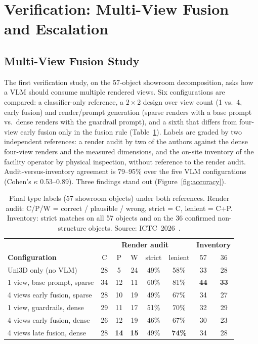 \section{Verification: Multi-View Fusion and Escalation}
\label{sec:exp-verify}

\subsection{Multi-View Fusion Study}
\label{subsec:exp-multiview}

The first verification study, on the 57-object showroom decomposition, asks
how a VLM should consume multiple rendered views. Six configurations are
compared: a classifier-only reference, a $2\times2$ design over view count
(1 vs.\ 4, early fusion) and render/prompt generation (sparse renders with a
base prompt vs.\ dense renders with the guardrail prompt), and a sixth that
differs from four-view early fusion only in the fusion rule
(Table~\ref{tab:configs}). Labels are graded by two
independent references: a render audit by two of the authors against the dense
four-view renders and the measured dimensions, and the on-site inventory of the
facility operator by physical inspection, without reference to the render
audit. Audit-versus-inventory agreement is 79--95\% over the five VLM
configurations (Cohen's $\kappa$ 0.53--0.89). Three findings stand out
(Figure~\ref{fig:accuracy}).

\begin{table}[htbp]
\caption{Final type labels (57 showroom objects) under both references. Render
audit: C/P/W = correct / plausible / wrong, strict = C, lenient = C+P.
Inventory: strict matches on all 57 objects and on the 36 confirmed
non-structure objects. Source: ICTC~2026~\cite{kim2026ictc}.}
\label{tab:configs}
\centering
\begin{tabular}{l c c c c c c c}
\toprule
 & \multicolumn{5}{c}{\textbf{Render audit}} & \multicolumn{2}{c}{\textbf{Inventory}} \\
\textbf{Configuration} & C & P & W & strict & lenient & 57 & 36 \\
\midrule
Uni3D only (no VLM)            & 28 & 5  & 24 & 49\% & 58\% & 33 & 28 \\
1 view, base prompt, sparse    & 34 & 12 & 11 & 60\% & 81\% & \textbf{44} & \textbf{33} \\
4 views early fusion, sparse   & 28 & 10 & 19 & 49\% & 67\% & 34 & 27 \\
1 view, guardrails, dense      & 29 & 11 & 17 & 51\% & 70\% & 32 & 29 \\
4 views early fusion, dense    & 26 & 12 & 19 & 46\% & 67\% & 30 & 23 \\
4 views late fusion, dense     & 28 & \textbf{14} & \textbf{15} & 49\% & \textbf{74\%} & 34 & 28 \\
\bottomrule
\end{tabular}
\end{table}


